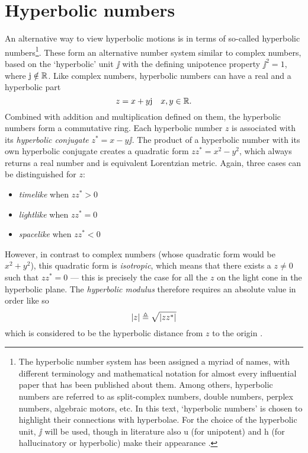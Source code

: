 \section{Hyperbolic numbers}
\label{sec:hyperbolic_numbers}
An alternative way to view hyperbolic motions is in terms of so-called hyperbolic numbers\footnote{The hyperbolic number system has been assigned a myriad of names, with different terminology and mathematical notation for almost every influential paper that has been published about them. Among others, hyperbolic numbers are referred to as split-complex numbers, double numbers, perplex numbers, algebraic motors, etc. In this text, `hyperbolic numbers' is chosen to highlight their connections with hyperbolae. For the choice of the hyperbolic unit, \(\jj\) will be used, though in literature also \(\mathrm{u}\) (for unipotent) and \(\mathrm{h}\) (for hallucinatory or hyperbolic) make their appearance \cite{Fjelstad1986, Sobczyk1995, Motter1998, Harkin2004}.}. These form an alternative number system similar to complex numbers, based on the `hyperbolic' unit \(\jj\) with the defining unipotence property \(\jj^2 = 1\), where \(\mathrm{j} \notin \mathbb{R}\). Like complex numbers, hyperbolic numbers can have a real and a hyperbolic part
\[
     z = x + y\mathrm{j} \quad x, y \in \mathbb{R}.
\]
Combined with addition and multiplication defined on them, the hyperbolic numbers form a commutative ring. Each hyperbolic number \(z\) is associated with its \emph{hyperbolic conjugate} \(z^* = x - y\jj\). The product of a hyperbolic number with its own hyperbolic conjugate creates a quadratic form \(zz^* = x^2 - y^2\), which always returns a real number and is equivalent Lorentzian metric. Again, three cases can be distinguished for \(z\):
\begin{itemize}
    \item \emph{timelike} when \(zz^* > 0\)
    \item \emph{lightlike} when \(zz^* = 0\)
    \item \emph{spacelike} when \(zz^* < 0\)
\end{itemize}
However, in contrast to complex numbers (whose quadratic form would be \(x^2 + y^2\)), this quadratic form is \emph{isotropic}, which means that there exists a \(z \neq 0\) such that \(zz^* = 0\) --- this is precisely the case for all the \(z\) on the light cone in the hyperbolic plane. The \emph{hyperbolic modulus} therefore requires an absolute value in order like so
\[
     \abs{z} \triangleq \sqrt{\abs{zz^*}}
\]
which is considered to be the hyperbolic distance from \(z\) to the origin \cite{Sobczyk1995}.

